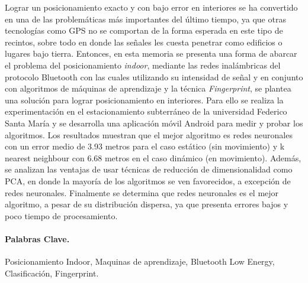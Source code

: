 
Lograr un posicionamiento exacto y con bajo error en interiores se ha convertido en una de las problemáticas más importantes del último tiempo, ya que otras tecnologías como GPS no se comportan de la forma esperada en este tipo de recintos, sobre todo en donde las señales les cuesta penetrar como edificios o lugares bajo tierra. Entonces, en esta memoria se presenta una forma de abarcar el problema del posicionamiento \textit{indoor}, mediante las redes inalámbricas del protocolo Bluetooth con las cuales utilizando su intensidad de señal y en conjunto con algoritmos de máquinas de aprendizaje y la técnica \textit{Fingerprint}, se plantea una solución para lograr posicionamiento en interiores. Para ello se realiza la experimentación en el estacionamiento subterráneo de la universidad Federico Santa María y se desarrolla una aplicación móvil Android para medir y probar los algoritmos. Los resultados muestran que el mejor algoritmo es redes neuronales con un error medio de 3.93 metros para el caso estático (sin movimiento) y k nearest neighbour con 6.68 metros en el caso dinámico (en movimiento). Además, se analizan las ventajas de usar técnicas de reducción de dimensionalidad como PCA, en donde la mayoría de los algoritmos se ven favorecidos, a excepción de redes neuronales. Finalmente se determina que redes neuronales es el mejor algoritmo, a pesar de su distribución dispersa, ya que presenta errores bajos y poco tiempo de procesamiento.

\vspace{20mm}

\paragraph{Palabras Clave.}
Posicionamiento Indoor, Maquinas de aprendizaje, Bluetooth Low Energy, Clasificación, Fingerprint.

